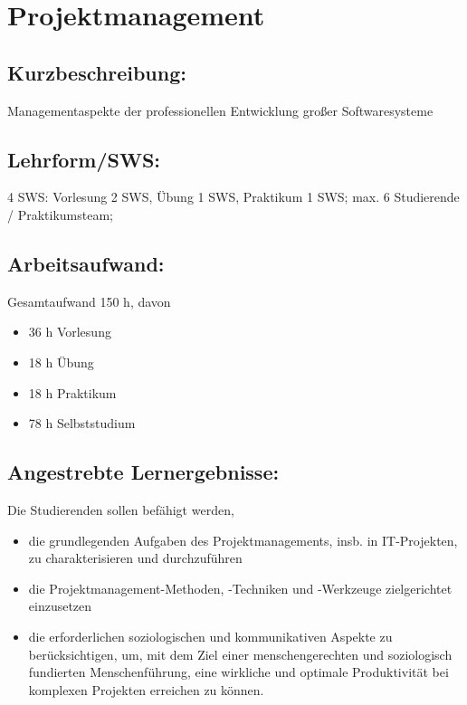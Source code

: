 \chapter{Projektmanagement}\label{projektmanagement}

\section{Kurzbeschreibung:}\label{kurzbeschreibung-3}

Managementaspekte der professionellen Entwicklung großer Softwaresysteme

\section{Lehrform/SWS:}\label{lehrformsws-20}

4 SWS: Vorlesung 2 SWS, Übung 1 SWS, Praktikum 1 SWS; max. 6 Studierende
/ Praktikumsteam;

\section{Arbeitsaufwand:}\label{arbeitsaufwand-20}

Gesamtaufwand 150 h, davon

\begin{itemize}
\tightlist
\item
  36 h Vorlesung
\item
  18 h Übung
\item
  18 h Praktikum
\item
  78 h Selbststudium
\end{itemize}

\section{Angestrebte
Lernergebnisse:}\label{angestrebte-lernergebnisse-20}

Die Studierenden sollen befähigt werden,

\begin{itemize}
\tightlist
\item
  die grundlegenden Aufgaben des Projektmanagements, insb. in
  IT-Projekten, zu charakterisieren und durchzuführen
\item
  die Projektmanagement-Methoden, -Techniken und -Werkzeuge
  zielgerichtet einzusetzen
\item
  die erforderlichen soziologischen und kommunikativen Aspekte zu
  berücksichtigen, um, mit dem Ziel einer menschengerechten und
  soziologisch fundierten Menschenführung, eine wirkliche und optimale
  Produktivität bei komplexen Projekten erreichen zu können.
\end{itemize}

